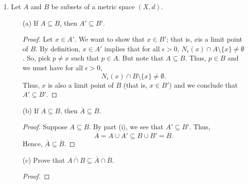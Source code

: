 \documentclass[a4paper]{article}
\begin{document}
\begin{enumerate}
\begin{proof}
    \( (\Longleftarrow ) \) Let \( x,y \in \R  \) such that \( x < y  \). We will show that there exists \( p \in E  \) such that \( x < p < y \). Suppose that \( \R = \overline{E}  \). Since \( x \in \R  \), we must have \( x \in \overline{E}  \). That is, for all \( \epsilon > 0  \), we have  
    \[  {N}_{\epsilon}(x) \cap E \neq \emptyset.  \]
    This implies that \( {N}_{\epsilon}(x)  \) contains a point \( p \neq  x   \) such that \( p \in E  \). This means that \( p \in (x - \epsilon , x + \epsilon) \) and so
    \[  x - \epsilon < p < x + \epsilon.  \]
    Since \( x < y  \), we have that 
    \[  x - \epsilon <  p < y  + \epsilon. \]
    Since \( \epsilon > 0 \) is arbitrary, we find that \( x < p < y  \) for some \( p \in E  \).
\end{proof}
    \item Let \( A  \) and \( B  \) be subsets of a metric space \( (X,d) \).
        \begin{enumerate}
            \item[(a)] If \( A \subseteq B  \), then \( A' \subseteq B' \).
                \begin{proof}
                Let \( x \in A' \). We want to show that \( x \in B' \); that is, \( x  \)is a limit point of \( B  \). By definition, \( x \in A'  \) implies that for all \( \epsilon > 0  \), \( {N}_{\epsilon}(x) \cap A \setminus  \{ x \} \neq \emptyset \). So, pick \( p \neq x  \) such that \( p \in A  \). But note that \( A \subseteq B  \). Thus, \( p \in  B \) and we must have for all \( \epsilon > 0 \), 
                \[  {N}_{\epsilon}(x) \cap B \setminus  \{ x \} \neq \emptyset. \]
                Thus, \( x  \) is also a limit point of \( B  \) (that is, \( x \in B' \)) and we conclude that \( A' \subseteq  B' \).
                \end{proof}
            \item[(b)] If \( A \subseteq  B  \), then \( \overline{A} \subseteq \overline{B} \).
                \begin{proof}
                Suppose \( A \subseteq  B  \). By part (i), we see that \( A' \subseteq  B ' \). Thus, 
                \[  \overline{A} = A \cup A' \subseteq  B \cup B' = \overline{B}. \]
                Hence, \( \overline{A} \subseteq \overline{B} \).
                \end{proof}
            \item[(c)] Prove that \( \overline{A \cap B} \subseteq \overline{A} \cap \overline{B} \).
                \begin{proof}

\end{proof}
\end{enumerate}
\end{enumerate}
\end{document}
